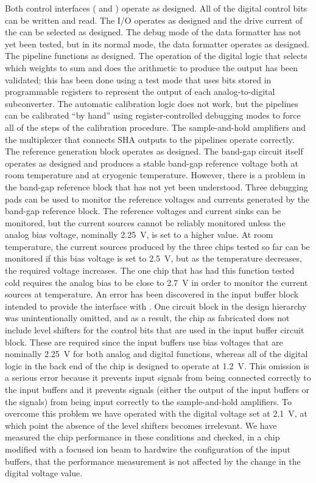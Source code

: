 Both control interfaces ( and ) operate as designed.  All of the digital control
bits can be written and read.  The  I/O operates as designed and the drive current of the
 can be selected as designed.  The debug mode of the data formatter has not yet been tested,
but in its normal mode, the data formatter operates as designed.  The  pipeline functions as
designed.  The operation of the digital logic that selects which weights to sum and does the arithmetic
to produce the  output has been validated; this has been done using a test mode that uses bits
stored in programmable registers to represent the output of each analog-to-digital subconverter.  The automatic
calibration logic does not work, but the pipelines can be calibrated ``by hand'' using register-controlled
debugging modes to force all of the steps of the calibration procedure.  The sample-and-hold amplifiers and the
multiplexer that connects SHA outputs to the  pipelines operate correctly.  The 
reference generation block operates as designed.  The band-gap circuit itself operates as designed and produces
a stable band-gap reference voltage both at room temperature and at cryogenic temperature.  However, there is a
problem in the band-gap reference block that has not yet been understood.  Three debugging pads can be used to
monitor the reference voltages and currents generated by the band-gap reference block.  The reference voltages
and current sinks can be monitored, but the current sources cannot be reliably monitored unless the analog bias
voltage, nominally \SI{2.25}{V}, is set to a higher value.  At room temperature, the current sources produced
by the three chips tested so far can be monitored if this bias voltage is set to \SI{2.5}{V}, but as the
temperature decreases, the required voltage increases.  The one chip that has had this function tested cold
requires the analog bias to be close to \SI{2.7}{V} in order to monitor the current sources at \lntwo
temperature.  An error has been discovered in the input buffer block intended to provide the interface with
.  One circuit block in the design hierarchy was unintentionally omitted, and as a result, the
chip as fabricated does not include level shifters for the control bits that are used in the input buffer
circuit block.  These are required since the input buffers use bias voltages that are nominally \SI{2.25}{V}
for both analog and digital functions, whereas all of the digital logic in the back end of the chip is designed
to operate at \SI{1.2}{V}.  This omission is a serious error because it prevents input signals from being
connected correctly to the input buffers and it prevents signals (either the output of the input buffers or
the  signals) from being input correctly to the sample-and-hold amplifiers. To overcome this
problem we have operated  with the digital voltage set at \SI{2.1}{V}, at which point the
absence of the level shifters becomes irrelevant. We have measured the chip performance in these conditions
and checked, in a chip modified with a focused ion beam to hardwire the configuration of the input buffers,
that the performance measurement is not affected by the change in the digital voltage value.

